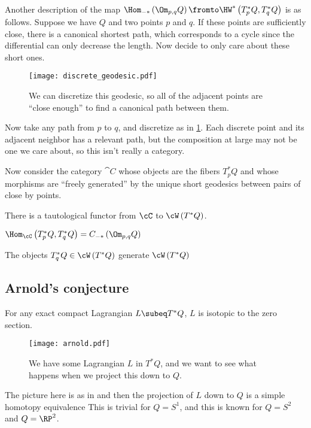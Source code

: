 \documentclass{amsart}
\begin{document}
\begin{rmk}
Another description of the map 
$\Hom_{-*}\left( \Om_{p,q} Q \right)\fromto
\HW^*\left( T_p^* Q , T_q^* Q \right)$ is as follows.
Suppose we have $Q$ and two points $p$ and $q$.
If these points are sufficiently close, there is a 
canonical shortest path, which corresponds to a cycle
since the differential can only decrease the length.
Now decide to only care about these short ones. 

\begin{figure}
\texttt{[image: discrete\_geodesic.pdf]}
\caption{We can discretize this geodesic, so all of the adjacent points
are ``close enough'' to find a canonical path between them.}
\label{fig:discrete_geodesic}
\end{figure}
Now take any path from $p$ to $q$, and discretize as in
\cref{fig:discrete_geodesic}.
Each discrete point and its adjacent neighbor has a relevant path, 
but the composition at large may not be one we care about, so
this isn't really a category.

Now consider the category $\cat{C}$ whose objects are the fibers
$T_p^* Q$ and whose morphisms are
``freely generated'' by the unique short geodesics between pairs of close by points.

There is a tautological functor from $\cC$ to $\cW\left( T^* Q \right)$. 
\begin{clm}
$\Hom_\cC\left( T^*_p Q , T^*_q Q \right) = C_{-*}\left( \Om_{p,q}Q \right)$
\end{clm}
\end{rmk}

\begin{thm}[Abouzaid]
The objects
$T_q^* Q\in \cW\left( T^* Q \right)$ generate $\cW\left( T^* Q \right)$
\end{thm}

\subsection{Arnold's conjecture}

\begin{con}[Arnold]
For any exact compact Lagrangian $L\subeq T^* Q$, 
$L$ is isotopic to the zero section.
\end{con}

\begin{figure}
\texttt{[image: arnold.pdf]}
\caption{We have some Lagrangian $L$ in $T^*Q$, and
we want to see what happens when we project this down to $Q$.}
\end{figure}
The picture here is as in 
and then the projection of $L$ down to $Q$ is a
simple homotopy equivalence
This is trivial for $Q = S^1$, 
and this is known for $Q = S^2$
and $Q = \RP^2$.
\end{document}
